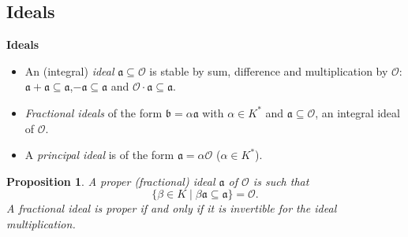 \documentclass[10pt]{beamer}
\theoremstyle{plain}
\newtheorem{proposition}{Proposition}
\theoremstyle{definition}
\newcommand{\Z}{\mathbb{Z}}
\newcommand{\mO}{\mathcal{O}}
\renewcommand{\(}{\left(}
\renewcommand{\)}{\right)}
\newcommand{\mf}[1]{\mathfrak{#1}}
\DeclareMathOperator{\disc}{disc}
\begin{document}







\subsection{Ideals}

\begin{frame}

\textbf{Ideals}

\begin{definition}
\begin{itemize}
\item An (integral) \emph{ideal} $\mf{a}\subseteq \mO$ is stable by sum, difference and multiplication by $\mO$: $\mf{a}+\mf{a}\subseteq\mf{a}$,$-\mf{a}\subseteq\mf{a}$ and $\mO\cdot \mf{a}\subseteq\mf{a}$.

\item \emph{Fractional ideals} of the form $\mf{b}=\alpha\mf{a}$ with $\alpha\in K^*$ and $\mf{a}\subseteq \mO$, an integral ideal of $\mO$.

\item A \emph{principal ideal} is of the form $\mf{a}=\alpha\mO$ ($\alpha\in K^*$).
\end{itemize}
\end{definition}

\pause

\begin{proposition}
A \emph{proper (fractional) ideal} $\mf{a}$ of $\mO$ is such that
\[\{\beta\in K\mid \beta\mf{a}\subseteq \mf{a}\}=\mO.\]
A fractional ideal is proper if and only if it is invertible for the ideal multiplication.
\end{proposition}

\end{frame}
\end{document}
